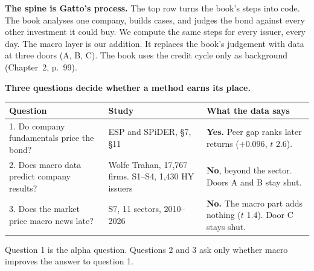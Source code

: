 \documentclass[10pt,a4paper]{article}
\begin{document}
\begin{center}
\end{center}

\vspace{-2mm}
\noindent\textbf{The spine is Gatto's process.} The top row turns the book's steps into code. The book analyses one company, builds cases, and judges the bond against every other investment it could buy. We compute the same steps for every issuer, every day. The macro layer is our addition. It replaces the book's judgement with data at three doors (A, B, C). The book uses the credit cycle only as background (Chapter~2, p.~99).

\smallskip
\noindent\textbf{Three questions decide whether a method earns its place.}
\begin{center}\small
\begin{tabularx}{\linewidth}{@{}>{\raggedright}p{4.6cm}>{\raggedright}p{3.4cm}X@{}}\toprule
Question & Study & What the data says \\\midrule
1. Do company fundamentals price the bond? & ESP and SPiDER, \S7, \S11 & \textcolor{good}{\textbf{Yes.}} Peer gap ranks later returns ($+0.096$, $t$ 2.6). \\
2. Does macro data predict company results? & Wolfe Trahan, 17,767 firms. S1--S4, 1,430 HY issuers & \textcolor{bad}{\textbf{No}}, beyond the sector. Doors A and B stay shut. \\
3. Does the market price macro news late? & S7, 11 sectors, 2010--2026 & \textcolor{bad}{\textbf{No.}} The macro part adds nothing ($t$ 1.4). Door C stays shut. \\\bottomrule
\end{tabularx}
\end{center}
Question 1 is the alpha question. Questions 2 and 3 ask only whether macro improves the answer to question 1.
\end{document}
